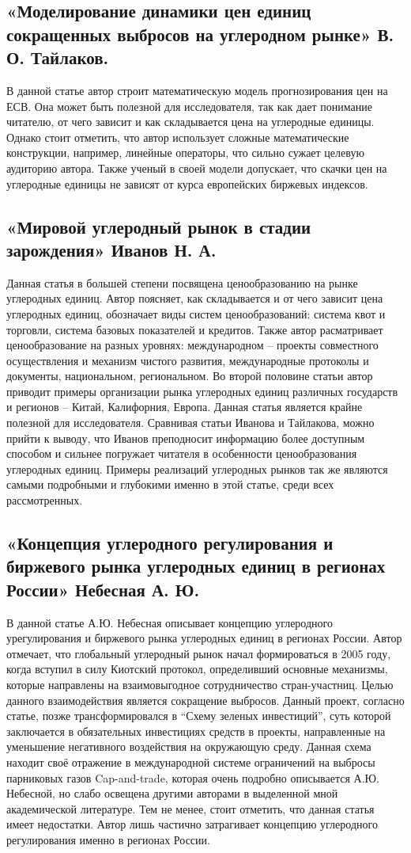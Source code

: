 \documentclass[a4paper,14pt]{article}
\begin{document}
\subsection{«Моделирование динамики цен единиц сокращенных выбросов на углеродном рынке» В. О. Тайлаков.}
В данной статье автор строит математическую модель прогнозирования цен на ЕСВ. Она может быть полезной для исследователя, так как дает понимание читателю, от чего зависит и как складывается цена на углеродные единицы. Однако стоит отметить, что автор использует сложные математические конструкции, например, линейные операторы, что сильно сужает целевую аудиторию автора. Также ученый в своей модели допускает, что скачки цен на углеродные единицы не зависят от курса европейских биржевых индексов.
\subsection{«Мировой углеродный рынок в стадии зарождения» Иванов Н. А.}
Данная статья в большей степени посвящена ценообразованию на рынке углеродных единиц. Автор поясняет, как складывается и от чего зависит цена углеродных единиц, обозначает виды систем ценообразований: система квот и торговли, система базовых показателей и кредитов. Также автор расматривает ценообразование на разных уровнях: международном – проекты совместного осуществления и механизм чистого развития, международные протоколы и документы, национальном, региональном. Во второй половине статьи автор приводит примеры организации рынка углеродных единиц различных государств и регионов – Китай, Калифорния, Европа. Данная статья является крайне полезной для исследователя. Сравнивая статьи Иванова и Тайлакова, можно прийти к выводу, что Иванов преподносит информацию более доступным способом и сильнее погружает читателя в особенности ценообразования углеродных единиц. Примеры реализаций углеродных рынков так же являются самыми подробными и глубокими именно в этой статье, среди всех рассмотренных.
\subsection{«Концепция углеродного регулирования и биржевого рынка углеродных единиц в регионах России» Небесная А. Ю.}
В данной статье А.Ю. Небесная описывает концепцию углеродного урегулирования и биржевого рынка углеродных единиц в регионах России. Автор отмечает, что глобальный углеродный рынок начал формироваться в 2005 году, когда вступил в силу Киотский протокол, определивший основные механизмы, которые направлены на взаимовыгодное сотрудничество стран-участниц. Целью данного взаимодействия является сокращение выбросов. Данный проект, согласно статье, позже трансформировался в “Схему зеленых инвестиций”, суть которой заключается в обязательных инвестициях средств в проекты, направленные на уменьшение негативного воздействия на окружающую среду. Данная схема находит своё отражение в международной системе ограничений на выбросы парниковых газов Cap-and-trade, которая очень подробно описывается А.Ю. Небесной, но слабо освещена другими авторами в выделенной мной академической литературе. Тем не менее, стоит отметить, что данная статья имеет недостатки. Автор лишь частично затрагивает концепцию углеродного регулирования именно в регионах России.
\end{document}
